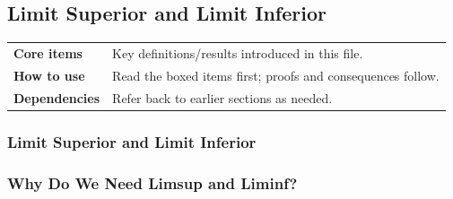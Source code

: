
\subsection{Limit Superior and Limit Inferior}

\begin{tcolorbox}[colback=gray!6, colframe=gray!40, arc=2pt,
  left=6pt, right=6pt, top=4pt, bottom=4pt,
  title={\small\textbf{Limsup Liminf — Quick Reference}},
  fonttitle=\small\bfseries]
\begin{tabular}{@{}p{}p{}@{}}
\textbf{Core items} & Key definitions/results introduced in this file.\\
\textbf{How to use} & Read the boxed items first; proofs and consequences follow.\\
\textbf{Dependencies} & Refer back to earlier sections as needed.\\
\end{tabular}
\end{tcolorbox}


\subsubsection{Limit Superior and Limit Inferior}

\subsubsection{Why Do We Need Limsup and Liminf?}

